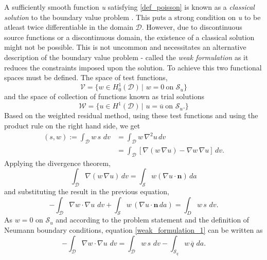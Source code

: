 A sufficiently smooth function \emph{u} satisfying \eqref{def_poisson} is known as a \emph{classical solution} to the boundary value problem \cite{arbenz2017}.
 This puts a strong condition on \emph{u} to be atleast twice differentiable in the domain $\mathcal{D}$.
However, due to discontinuous source functions or a discontinuous domain, the existence of a classical solution might not be possible.
This is not uncommon and necessitates an alternative description of the boundary value problem
 - called the \emph{weak formulation} as it reduces the constraints imposed upon the solution.
To achieve this two functional spaces must be defined. The space of test functions,
\begin{equation} \label{test_space}
    \mathcal{V} = \{
        w \in H^{1}_{0}(\mathcal{D}) \, | \, \, w = 0 \ \text{on $\mathcal{S}_{u}$}
        \}
\end{equation}
and the space of collection of functions known as trial solutions
\begin{equation} \label{solution_space}
    \mathcal{W} = \{
        u \in H^{1}(\mathcal{D}) \, | \,\, u = \overline{u} \ \text{on $\mathcal{S}_{u}$}.
        \}
\end{equation}
%
Based on the weighted residual method, using these test functions and using the product rule on the right hand side, we get
\begin{align*}
    (s, w) := \int_{\mathcal{D}}  w\, s\,\, dv &= \int_{\mathcal{D}} w \, \nabla^{2} u \,dv\\
    &= \int_{\mathcal{D}}[\nabla(w \, \nabla u) - \nabla w \, \nabla u] \,dv.
\end{align*} 
Applying the divergence theorem,
\begin{equation}
    \int_{\mathcal{D}} \nabla(w \, \nabla u) \,dv = \int_{\mathcal{S}} w (\nabla u \cdot \boldsymbol{n}) \,da
\end{equation}
and substituting the result in the previous equation,
\begin{equation} \label{weak_formulation_1}
    -\int_{\mathcal{D}} \nabla w \cdot \nabla u \, \,dv + 
        \int_{\mathcal{S}} w \,(\nabla u \cdot \boldsymbol{n} \,da)  =  \int_{D} w \, s \, \,dv.
\end{equation}
As $w = 0$ on $\mathcal{S}_{u}$ and according to the problem statement and the definition of Neumann boundary conditions, equation
 \eqref{weak_formulation_1} can be written as
\begin{equation} \label{weak_formulation_2}
    - \int_{\mathcal{D}} \nabla w \cdot \nabla u \, \,dv = \int_{\mathcal{D}} w \, s \,\,dv - \int_{\mathcal{S}_{q}} w \, \overline{q} \,\,da.
\end{equation}

